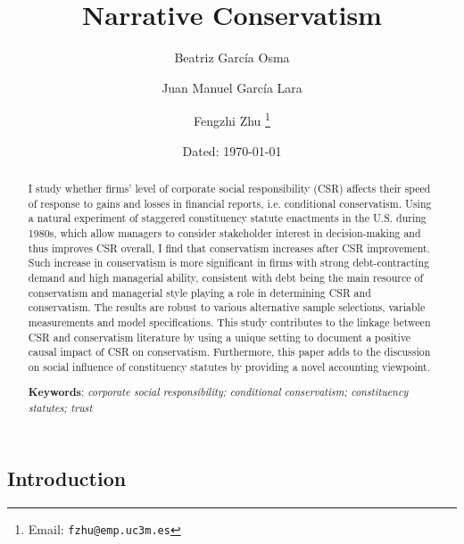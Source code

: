 \documentclass[a4paper]{article}
\begin{document}
	
	\title{Narrative Conservatism}
	
	\author{Beatriz Garc\'ia Osma}
	
	\author{Juan Manuel Garc\'ia Lara}
	
	\author{Fengzhi Zhu%
		\thanks{Email: \texttt{fzhu@emp.uc3m.es}}}
	
	
	\date{Dated: \today}
	
	\maketitle

\begin{spacing}{2}
\begin{abstract}
	I study whether firms' level of corporate social responsibility (CSR) affects their speed of response to gains and losses in financial reports, i.e. conditional conservatism. Using a natural experiment of staggered constituency statute enactments in the U.S. during 1980s, which allow managers to consider stakeholder interest in decision-making and thus improves CSR overall, I find that conservatism increases after CSR improvement. Such increase in conservatism is more significant in firms with strong debt-contracting demand and high managerial ability, consistent with debt being the main resource of conservatism and managerial style playing a role in determining CSR and conservatism. The results are robust to various alternative sample selections, variable measurements and model specifications. This study contributes to the linkage between CSR and conservatism literature by using a unique setting to document a positive causal impact of CSR on conservatism. Furthermore, this paper adds to the discussion on social influence of constituency statutes by providing a novel accounting viewpoint.\\
	\newline
	
	\textbf{Keywords}: \textit{corporate social responsibility;  conditional conservatism; constituency statutes; trust}
\end{abstract}

\clearpage

\section{Introduction}
\cite{}


\end{spacing}
\end{document}
